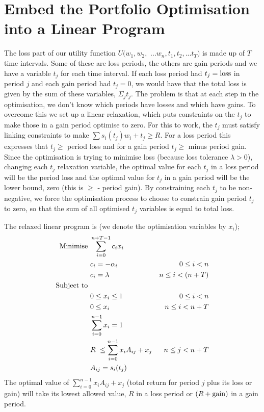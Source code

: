 \documentclass[12pt]{article}
\begin{document}
\section{Embed the Portfolio Optimisation into a Linear Program}
The loss part of our utility function $U(w_1,w_2,$ $...w_n,t_1,t_2,...t_T)$ is made up of $T$ time intervals. Some of these
are loss periods, the others are gain periods and we have a variable $t_j$ for each time interval. If each loss period had $t_j = {\rm loss}$ in period $j$ and each gain period had
$t_j=0$, we would have that the total loss is given by the sum of these variables, $\Sigma_j t_j$. The problem is that at each step in the optimisation,
we don't know which periods have losses and which have gains. To overcome this we set up a linear relaxation, which puts constraints on the $t_j$ to make those in a gain period optimise to zero.
For this to work, the $t_j$ must satisfy
linking constraints to make $\sum s_i( t_j )w_i +t_j \ge R$. For a loss period this expresses that $t_j \ge$ period loss and for a gain period
$t_j \ge$ minus period gain. Since the optimisation is trying to minimise loss (because loss tolerance $\lambda > 0$), changing each $t_j$ relaxation variable, the optimal value 
for each $t_j$ in a loss period will be the period loss and the optimal value for $t_j$ in a gain period will be the lower bound, zero (this is $\ge$ - period gain).
By constraining each $t_j$ to be non-negative, we force the optimisation process to choose to constrain gain period 
$t_j$ to zero, so that the sum of all optimised $t_j$ variables is equal to total loss.

The relaxed linear program is (we denote the optimisation variables by $x_i$);
\begin{align*}
    {\rm Minimise}\ & \sum_{i=0}^{n+T-1} c_i x_i\cr
    &c_i=-\alpha_i &0\le i < n\cr
    &c_i =\lambda &n\le i < (n+T)\cr
    {\rm Subject\ to}\ &\cr& 0 \le x_i \le 1\ &0\le i < n\cr
    & 0 \le x_i \ &n\le i < n+T\cr
    & \sum_{i=0}^{n-1} x_i = 1\cr
    & R\ \le\sum_{i=0}^{n-1} x_i A_{ij} + x_j  &n\le j < n+T\cr
    & A_{ij} = s_i(t_j )\cr
\end{align*}
The optimal value of $\sum_{i=0}^{n-1} x_i A_{ij} + x_j$ (total return for period $j$ plus its loss or gain) will take its lowest allowed value, $R$ in a loss period or $(R+{\rm gain})$ in a gain period.
\end{document}
